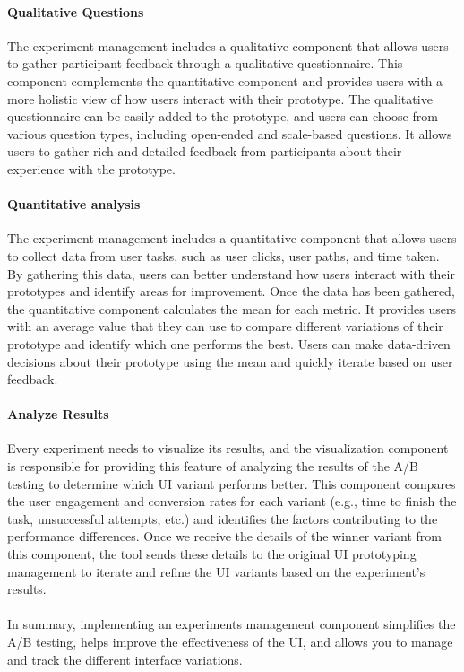 \paragraph{Qualitative Questions}
The experiment management includes a qualitative component that allows users to gather participant feedback through a qualitative questionnaire. 
This component complements the quantitative component and provides users with a more holistic view of how users interact with their prototype.
The qualitative questionnaire can be easily added to the prototype, and users can choose from various question types, including open-ended and scale-based questions. 
It allows users to gather rich and detailed feedback from participants about their experience with the prototype.

\paragraph{Quantitative analysis}
The experiment management includes a quantitative component that allows users to collect data from user tasks, such as user clicks, user paths, and time taken. 
By gathering this data, users can better understand how users interact with their prototypes and identify areas for improvement.
Once the data has been gathered, the quantitative component calculates the mean for each metric. It provides users with an average value that they can use to compare different variations of their prototype and identify which one performs the best.
Users can make data-driven decisions about their prototype using the mean and quickly iterate based on user feedback. 

\paragraph{Analyze Results}
Every experiment needs to visualize its results, and the visualization component is responsible for providing this feature of analyzing the results of the A/B testing to determine which UI variant performs better. 
This component compares the user engagement and conversion rates for each variant (e.g., time to finish the task, unsuccessful attempts, etc.) and identifies the factors contributing to the performance differences. 
Once we receive the details of the winner variant from this component, the tool sends these details to the original UI prototyping management to iterate and refine the UI variants based on the experiment's results. \\\\
In summary, implementing an experiments management component simplifies the A/B testing, helps improve the effectiveness of the UI, and allows you to manage and track the different interface variations.

